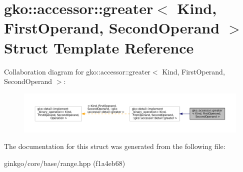 \hypertarget{structgko_1_1accessor_1_1greater}{}\section{gko\+:\+:accessor\+:\+:greater$<$ Kind, First\+Operand, Second\+Operand $>$ Struct Template Reference}
\label{structgko_1_1accessor_1_1greater}


Collaboration diagram for gko\+:\+:accessor\+:\+:greater$<$ Kind, First\+Operand, Second\+Operand $>$\+:
\nopagebreak
\begin{figure}[H]
\begin{center}
\leavevmode
\includegraphics[width=350pt]{structgko_1_1accessor_1_1greater__coll__graph}
\end{center}
\end{figure}


The documentation for this struct was generated from the following file\+:\begin{DoxyCompactItemize}
\item 
ginkgo/core/base/range.\+hpp (f1a4eb68)\end{DoxyCompactItemize}
